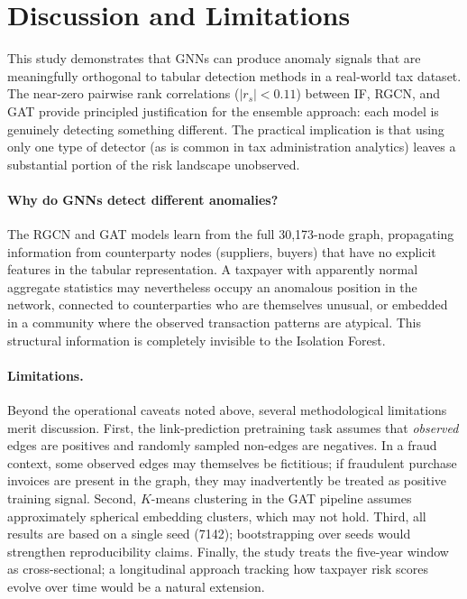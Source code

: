 \documentclass[10pt,twocolumn]{article}
\begin{document}
\section{Discussion and Limitations}
\label{sec:discussion}

This study demonstrates that GNNs can produce anomaly signals that are
meaningfully orthogonal to tabular detection methods in a real-world tax
dataset. The near-zero pairwise rank correlations ($|r_s| < 0.11$) between
IF, RGCN, and GAT provide principled justification for the ensemble approach:
each model is genuinely detecting something different. The practical implication
is that using only one type of detector (as is common in tax administration
analytics) leaves a substantial portion of the risk landscape unobserved.

\paragraph{Why do GNNs detect different anomalies?} The RGCN and GAT models
learn from the full 30,173-node graph, propagating information from
counterparty nodes (suppliers, buyers) that have no explicit features in the
tabular representation. A taxpayer with apparently normal aggregate statistics
may nevertheless occupy an anomalous position in the network, connected to
counterparties who are themselves unusual, or embedded in a community where
the observed transaction patterns are atypical. This structural information is
completely invisible to the Isolation Forest.

\paragraph{Limitations.} Beyond the operational caveats noted above, several
methodological limitations merit discussion. First, the link-prediction
pretraining task assumes that \emph{observed} edges are positives and randomly
sampled non-edges are negatives. In a fraud context, some observed edges may
themselves be fictitious; if fraudulent purchase invoices are present in the
graph, they may inadvertently be treated as positive training signal. Second,
$K$-means clustering in the GAT pipeline assumes approximately spherical
embedding clusters, which may not hold. Third, all results are based on a
single seed (7142); bootstrapping over seeds would strengthen reproducibility
claims. Finally, the study treats the five-year window as cross-sectional; a
longitudinal approach tracking how taxpayer risk scores evolve over time would
be a natural extension.
\end{document}
